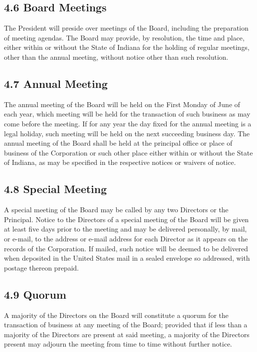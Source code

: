 \documentclass[
]{book}
\begin{document}
\subsection{4.6 Board Meetings}\label{board-meetings}

The President will preside over meetings of the Board, including the preparation of meeting agendas. The Board may provide, by resolution, the time and place, either within or without the State of Indiana for the holding of regular meetings, other than the annual meeting, without notice other than such resolution.

\subsection{4.7 Annual Meeting}\label{annual-meeting}

The annual meeting of the Board will be held on the First Monday of June of each year, which meeting will be held for the transaction of such business as may come before the meeting. If for any year the day fixed for the annual meeting is a legal holiday, such meeting will be held on the next succeeding business day. The annual meeting of the Board shall be held at the principal office or place of business of the Corporation or such other place either within or without the State of Indiana, as may be specified in the respective notices or waivers of notice.

\subsection{4.8 Special Meeting}\label{special-meeting}

A special meeting of the Board may be called by any two Directors or the Principal. Notice to the Directors of a special meeting of the Board will be given at least five days prior to the meeting and may be delivered personally, by mail, or e-mail, to the address or e-mail address for each Director as it appears on the records of the Corporation. If mailed, such notice will be deemed to be delivered when deposited in the United States mail in a sealed envelope so addressed, with postage thereon prepaid.

\subsection{4.9 Quorum}\label{quorum}

A majority of the Directors on the Board will constitute a quorum for the transaction of business at any meeting of the Board; provided that if less than a majority of the Directors are present at said meeting, a majority of the Directors present may adjourn the meeting from time to time without further notice.
\end{document}
